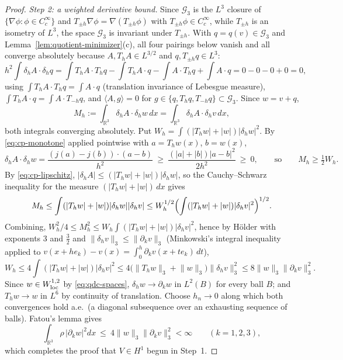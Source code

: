 \documentclass[11pt]{article}
\theoremstyle{definition}
\theoremstyle{plain}
\newcommand{\R}{\mathbb R}
\newcommand{\norm}[1]{\lVert #1\rVert}
\begin{document}
\begin{proof}
\emph{Step 2: a weighted derivative bound.}  Since $\mathcal G_3$ is the
$L^3$ closure of $\{\nabla\phi:\phi\in C_c^\infty\}$ and
$T_{\pm h}\nabla\phi=\nabla(T_{\pm h}\phi)$ with $T_{\pm h}\phi\in C_c^\infty$,
while $T_{\pm h}$ is an isometry of $L^3$, the space $\mathcal G_3$ is
invariant under $T_{\pm h}$.  With $q=q(v)\in\mathcal G_3$ and
Lemma~\ref{lem:quotient-minimizer}(c), all four pairings below vanish and
all converge absolutely because $A,T_hA\in L^{3/2}$ and
$q,T_{\pm h}q\in L^3$:
\[
 h^2\!\int\delta_hA\cdot\delta_hq
 =\int T_hA\cdot T_hq-\int T_hA\cdot q-\int A\cdot T_hq+\int A\cdot q
 =0-0-0+0=0,
\]
using $\int T_hA\cdot T_hq=\int A\cdot q$ (translation invariance of
Lebesgue measure), $\int T_hA\cdot q=\int A\cdot T_{-h}q$, and
$\langle A,g\rangle=0$ for $g\in\{q,T_hq,T_{-h}q\}\subset\mathcal G_3$.
Since $w=v+q$,
\begin{equation}\label{eq:qe-diffquot-id}
 M_h:=\int_{\R^3}\delta_hA\cdot\delta_hw\,dx
 =\int_{\R^3}\delta_hA\cdot\delta_hv\,dx ,
\end{equation}
both integrals converging absolutely.  Put
$W_h=\int(|T_hw|+|w|)|\delta_hw|^2$.  By \eqref{eq:cp-monotone} applied
pointwise with $a=T_hw(x)$, $b=w(x)$,
\[
 \delta_hA\cdot\delta_hw
 =\frac{(j(a)-j(b))\cdot(a-b)}{h^2}
 \ \ge\ \frac{(|a|+|b|)|a-b|^2}{2h^2}\ \ge\ 0 ,
 \qquad\text{so}\qquad M_h\ge\tfrac12W_h .
\]
By \eqref{eq:cp-lipschitz}, $|\delta_hA|\le(|T_hw|+|w|)|\delta_hw|$, so the
Cauchy--Schwarz inequality for the measure $(|T_hw|+|w|)\,dx$ gives
\[
 M_h\le\int(|T_hw|+|w|)|\delta_hw||\delta_hv|
 \le W_h^{1/2}\Bigl(\int(|T_hw|+|w|)|\delta_hv|^2\Bigr)^{1/2}.
\]
Combining, $W_h^2/4\le M_h^2\le W_h\int(|T_hw|+|w|)|\delta_hv|^2$, hence by
H\"older with exponents $3$ and $\frac32$ and
$\norm{\delta_hv}_3\le\norm{\partial_kv}_3$ (Minkowski's integral
inequality applied to $v(x+he_k)-v(x)=\int_0^h\partial_kv(x+te_k)\,dt$),
\[
 W_h\le4\int(|T_hw|+|w|)|\delta_hv|^2
 \le4\bigl(\norm{T_hw}_3+\norm w_3\bigr)\norm{\delta_hv}_3^2
 \le8\norm w_3\norm{\partial_kv}_3^2 .
\]
Since $w\in W^{1,2}_{\rm loc}$ by \eqref{eq:qdc-spaces}, $\delta_hw\to\partial_kw$
in $L^2(B)$ for every ball $B$; and $T_hw\to w$ in $L^6$ by continuity of
translation.  Choose $h_n\to0$ along which both convergences hold a.e.\ (a
diagonal subsequence over an exhausting sequence of balls).  Fatou's lemma
gives
\begin{equation}\label{eq:qe-weightedgrad}
 \int_{\R^3}\rho\,|\partial_kw|^2dx
 \ \le\ 4\norm w_3\norm{\partial_kv}_3^2<\infty
 \qquad(k=1,2,3),
\end{equation}
which completes the proof that $V\in H^1$ begun in Step~1.


\end{proof}
\end{document}
